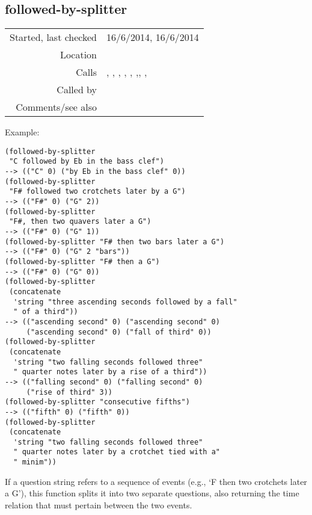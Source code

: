 \subsection*{followed-by-splitter}\label{fun:followed-by-splitter}

\vspace{0.3cm}
\begin{tabular}{r|p{8cm}}
Started, last checked & 16/6/2014, 16/6/2014 \\
Location & \nameref{sec:analytic-string-manipulations} \\
Calls & \nameref{fun:concat-strings}, \nameref{fun:consecutive-question2list}, \nameref{fun:modify-by-later}, \nameref{fun:my-last}, \nameref{fun:pitch-class-sequntial-expression2list}, \nameref{fun:replace-all},\nameref{fun:space-bar-separated-string2list}, \nameref{fun:string-separated-string2list}, \nameref{fun:tied-question2list} \\
Called by & \nameref{fun:Stravinsqi-Jun2014} \\
Comments/see also &
\end{tabular}

\vspace{0.5cm}
\noindent Example:
\begin{verbatim}
(followed-by-splitter
 "C followed by Eb in the bass clef")
--> (("C" 0) ("by Eb in the bass clef" 0))
(followed-by-splitter
 "F# followed two crotchets later by a G")
--> (("F#" 0) ("G" 2))
(followed-by-splitter
 "F#, then two quavers later a G")
--> (("F#" 0) ("G" 1))
(followed-by-splitter "F# then two bars later a G")
--> (("F#" 0) ("G" 2 "bars"))
(followed-by-splitter "F# then a G")
--> (("F#" 0) ("G" 0))
(followed-by-splitter
 (concatenate
  'string "three ascending seconds followed by a fall"
  " of a third"))
--> (("ascending second" 0) ("ascending second" 0)
     ("ascending second" 0) ("fall of third" 0))
(followed-by-splitter
 (concatenate
  'string "two falling seconds followed three"
  " quarter notes later by a rise of a third"))
--> (("falling second" 0) ("falling second" 0)
     ("rise of third" 3))
(followed-by-splitter "consecutive fifths")
--> (("fifth" 0) ("fifth" 0))
(followed-by-splitter
 (concatenate
  'string "two falling seconds followed three"
  " quarter notes later by a crotchet tied with a"
  " minim"))
\end{verbatim}

\noindent If a question string refers to a sequence of
events (e.g., `F then two crotchets later a G'), this
function splits it into two separate questions, also
returning the time relation that must pertain between
the two events.


